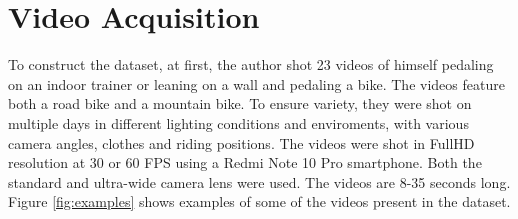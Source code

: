 \section{Video Acquisition}

To construct the dataset, at first, the author shot 23 videos of himself pedaling on an indoor trainer or leaning on a wall and pedaling a bike. The videos feature both a road bike and a mountain bike. To ensure variety, they were shot on multiple days in different lighting conditions and enviroments, with various camera angles, clothes and riding positions. The videos were shot in FullHD resolution at 30 or 60 FPS using a Redmi Note 10 Pro smartphone. Both the standard and ultra-wide camera lens were used. The videos are 8-35 seconds long. Figure \ref{fig:examples} shows examples of some of the videos present in the dataset.

\def\imgwidth{0.325\textwidth}

